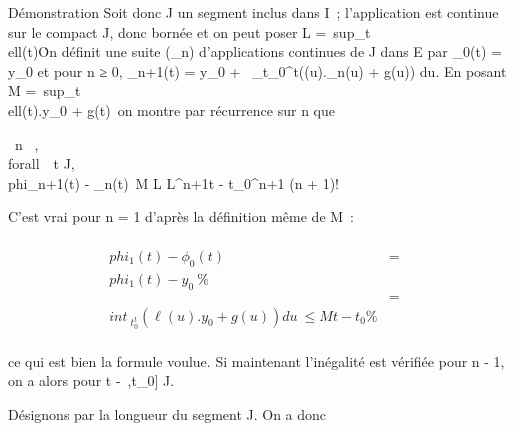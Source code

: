 \documentclass[]{article}
\begin{document}
Démonstration Soit donc J un segment inclus dans I~; l'application \ell est
continue sur le compact J, donc bornée et on peut poser L
=\
sup_t\inJ\\ell(t)\.
On définit une suite (\phi_n) d'applications continues de J dans E
par \phi_0(t) = y_0 et pour n ≥ 0, \phi_n+1(t) =
y_0 +\int ~
_t_0^t\left (\ell(u).\phi_n(u)
+ g(u)\right ) du. En posant M
=\
sup_t\inJ\\ell(t).y_0 +
g(t)\, on montre par récurrence sur n que

\forall~n \in {}~, \\forall~~t \in J,
\\phi_n+1(t) -
\phi_n(t)\ \leq M \over L
 L^n+1t - t_0^n+1
\over (n + 1)!

C'est vrai pour n = 1 d'après la définition même de M~:

\begin{align*}
\\phi_1(t) -
\phi_0(t)& =&
\\phi_1(t) -
y_0\ \%&
\\ & =&
\\int ~
_t_0^t(\ell(u).y_ 0 + g(u))
du\ \leq Mt - t_0\%&
\\ \end{align*}

ce qui est bien la formule voulue. Si maintenant l'inégalité est
vérifiée pour n - 1, on a alors pour t \in [t_0,+\infty~[\bigcapJ

\begin{align*}
\\phi_n+1(t) -
\phi_n(t)& =&
\\int ~
_t_0^t\left (\ell(u).\phi_ n(u)
- \ell(u).\phi_n-1(u))\right )
du\\%
\int ~
_t_0^t\\ell(u)\.\\phi_
n(u) - \phi_n-1(u)\ du \%&
\\ & \leq& \int ~
_t_0^tL\\phi_ n(u)
- \phi_n-1(u)\ du \%&
\\ & \leq& L\int ~
_t_0^t M \over L 
L^nu - t_0^n
\over n! du \%& \\ &
=& M \over L  L^n+1t -
t_0^n+1 \over (n + 1)!
\%& \\ \end{align*}

Un calcul similaire conduit à la même inégalité pour t \in]
-\infty~,t_0] \bigcap J.

Désignons par \eta la longueur du segment J. On a donc
\end{document}
